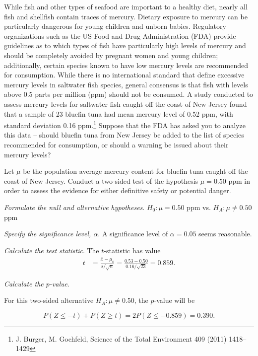 \begin{spacing}{1.5}
\begin{example}
{While fish and other types of seafood are important to a healthy diet, nearly all fish and shellfish contain traces of mercury. Dietary exposure to mercury can be particularly dangerous for young children and unborn babies. Regulatory organizations such as the US Food and Drug Administration (FDA) provide guidelines as to which types of fish have particularly high levels of mercury and should be completely avoided by pregnant women and young children; additionally, certain species known to have low mercury levels are recommended for consumption. While there is no international standard that define excessive mercury levels in saltwater fish species, general consensus is that fish with levels above 0.5 parts per million (ppm) should not be consumed. A study conducted to assess mercury levels for saltwater fish caught off the coast of New Jersey found that a sample of 23 bluefin tuna had mean mercury level of 0.52 ppm, with standard deviation 0.16 ppm.\footnote{J. Burger, M. Gochfeld, Science of the Total Environment 409 (2011) 1418–1429} Suppose that the FDA has asked you to analyze this data -- should bluefin tuna from New Jersey be added to the list of species recommended for consumption, or should a warning be issued about their mercury levels?}
\label{hypTestTuna}

Let $\mu$ be the population average mercury content for bluefin tuna caught off the coast of New Jersey. Conduct a two-sided test of the hypothesis $\mu = 0.50$ ppm in order to assess the evidence for either definitive safety or potential danger.

\textit{Formulate the null and alternative hypotheses}. $H_0: \mu = 0.50$ ppm vs. $H_A: \mu \neq 0.50$ ppm

\textit{Specify the significance level, $\alpha$}.  A significance level of $\alpha = 0.05$ seems reasonable. 

\textit{Calculate the test statistic}. The  $t$-statistic has value
\begin{align*}
t &= \frac{\overline{x}-\mu_0}{s/\sqrt{n}} = \frac{0.53 - 0.50} {0.16/\sqrt{23}} = 0.859.
\end{align*}

\textit{Calculate the $p$-value}.

For this two-sided alternative $H_A: \mu \neq 0.50$, the $p$-value will be 

\[P(Z \leq -t) + P(Z \geq t)= 2P(Z \leq - 0.859) = 0.390.\]


\end{example}
\end{spacing}
